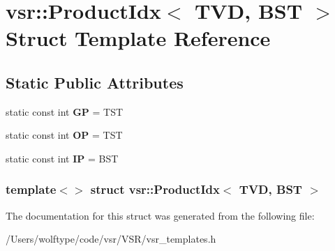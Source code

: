 \hypertarget{structvsr_1_1_product_idx_3_01_t_v_d_00_01_b_s_t_01_4}{\section{vsr\-:\-:Product\-Idx$<$ T\-V\-D, B\-S\-T $>$ Struct Template Reference}
\label{structvsr_1_1_product_idx_3_01_t_v_d_00_01_b_s_t_01_4}
}
\subsection*{Static Public Attributes}
\begin{DoxyCompactItemize}
\item 
\hypertarget{structvsr_1_1_product_idx_3_01_t_v_d_00_01_b_s_t_01_4_a595a8a0ba2e3bdcd4d7cb54a9bdc01f8}{static const int {\bfseries G\-P} = T\-S\-T}\label{structvsr_1_1_product_idx_3_01_t_v_d_00_01_b_s_t_01_4_a595a8a0ba2e3bdcd4d7cb54a9bdc01f8}

\item 
\hypertarget{structvsr_1_1_product_idx_3_01_t_v_d_00_01_b_s_t_01_4_a02e2dfbf2d99a2d23903f78b12503671}{static const int {\bfseries O\-P} = T\-S\-T}\label{structvsr_1_1_product_idx_3_01_t_v_d_00_01_b_s_t_01_4_a02e2dfbf2d99a2d23903f78b12503671}

\item 
\hypertarget{structvsr_1_1_product_idx_3_01_t_v_d_00_01_b_s_t_01_4_a1962290f3b6cd8c3b56511b37fe7eecb}{static const int {\bfseries I\-P} = B\-S\-T}\label{structvsr_1_1_product_idx_3_01_t_v_d_00_01_b_s_t_01_4_a1962290f3b6cd8c3b56511b37fe7eecb}

\end{DoxyCompactItemize}
\subsubsection*{template$<$$>$ struct vsr\-::\-Product\-Idx$<$ T\-V\-D, B\-S\-T $>$}



The documentation for this struct was generated from the following file\-:\begin{DoxyCompactItemize}
\item 
/\-Users/wolftype/code/vsr/\-V\-S\-R/vsr\-\_\-templates.\-h\end{DoxyCompactItemize}
